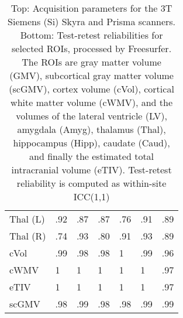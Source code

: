 \begin{table}
{\begin{tabular}{lllllll}
Thal (L)              &                 .92 &                 .87 &               .87 &                .76 &                .91 &                .89 \\
Thal (R)              &                 .74 &                 .93 &               .80 &                .91 &                .93 &                .89 \\
cVol                  &                 .99 &                 .98 &               .98 &                1   &                .99 &                .96 \\
cWMV                  &                 1   &                 1   &               1   &                1   &                1   &                .97 \\
eTIV                  &                 1   &                 1   &               1   &                1   &                1   &                .97 \\
scGMV                 &                 .98 &                 .99 &               .98 &                .98 &                .99 &                .99 \\
\bottomrule
\end{tabular}}
\caption{Top: Acquisition parameters for the 3T Siemens (Si) Skyra and Prisma scanners.  Bottom: Test-retest reliabilities for selected ROIs, processed by Freesurfer. The ROIs are gray matter volume (GMV), subcortical gray matter volume (scGMV), cortex volume (cVol), cortical white matter volume (cWMV), and the volumes of the lateral ventricle (LV), amygdala (Amyg), thalamus (Thal), hippocampus (Hipp), caudate (Caud), and finally the estimated total intracranial volume (eTIV). Test-retest reliability is computed as within-site ICC(1,1)} 
\label{tab:acquisition3}

\end{table}